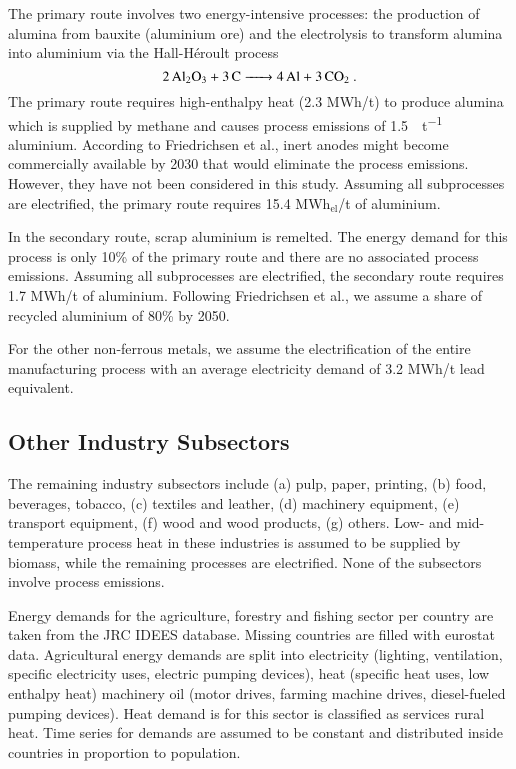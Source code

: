 The primary route involves two energy-intensive processes: the production of
alumina from bauxite (aluminium ore) and the electrolysis to transform alumina
into aluminium via the  Hall-H\'{e}roult process
\begin{equation}
    \ce{2Al2O3 + 3C -> 4Al + 3\co}.
\end{equation}
The primary route requires high-enthalpy heat (2.3 MWh/t) to produce alumina
which is supplied by methane and causes process emissions of
\SI{1.5}{\tco\per\tonne} aluminium. According to Friedrichsen et al.,
inert anodes might become commercially available by 2030 that would eliminate
the process emissions. However, they have not been considered in this study.
Assuming all subprocesses are electrified, the primary route requires 15.4
MWh$_{\text{el}}$/t of aluminium.

In the secondary route, scrap aluminium is remelted. The energy demand for this
process is only 10\% of the primary route and there are no associated process
emissions. Assuming all subprocesses are electrified, the secondary route
requires 1.7 MWh/t of aluminium. Following Friedrichsen et al., we assume
a share of recycled aluminium of 80\% by 2050.

For the other non-ferrous metals, we assume the electrification of the entire
manufacturing process with an average electricity demand of 3.2 MWh\el/t lead
equivalent.

\subsection{Other Industry Subsectors}
\label{sec:si:industry:other}

The remaining industry subsectors include (a) pulp, paper, printing, (b) food,
beverages, tobacco, (c) textiles and leather, (d) machinery equipment, (e)
transport equipment, (f) wood and wood products, (g) others. Low- and
mid-temperature process heat in these industries is assumed to be supplied by
biomass, while the remaining processes are
electrified. None of the subsectors involve process emissions.

Energy demands for the agriculture, forestry and fishing sector per country are
taken from the JRC IDEES database. Missing countries are filled
with eurostat data. Agricultural energy
demands are split into electricity (lighting, ventilation, specific electricity
uses, electric pumping devices), heat (specific heat uses, low enthalpy heat)
machinery oil (motor drives, farming machine drives, diesel-fueled pumping
devices). Heat demand is for this sector is classified as services rural heat.
Time series for demands are assumed to be constant and distributed inside
countries in proportion to population.

